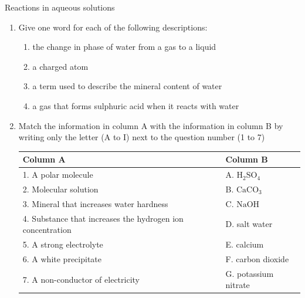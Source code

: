 {{            \begin{eocexercises}{Reactions in aqueous solutions}
            \nopagebreak
            \label{m38719*id342869}\begin{enumerate}[noitemsep, label=\textbf{\arabic*}. ] 
            \label{m38719*uid107}\item Give one word for each of the following descriptions:
\label{m38719*id342885}\begin{enumerate}[noitemsep, label=\textbf{\alph*}. ] 
            \label{m38719*uid108}\item the change in phase of water from a gas to a liquid
\label{m38719*uid109}\item a charged atom
\label{m38719*uid110}\item a term used to describe the mineral content of water
\label{m38719*uid111}\item a gas that forms sulphuric acid when it reacts with water
\end{enumerate}
\label{m38719*uid112}\item Match the information in column A with the information in column B by writing only the letter (A to I) next to the question number (1 to 7)
          \begin{table}[H]
        \begin{center}
      \label{m38719*id342952}
    \noindent
      \begin{tabular}{|l|l|}\hline
        \textbf{Column A} &
        \textbf{Column B} \\ \hline
        1. A polar molecule &
        A. ${\text{H}}_{2}{\text{SO}}_{4}$ \\ \hline
        2. Molecular solution &
        B. ${\text{CaCO}}_{3}$ \\ \hline
        3. Mineral that increases water hardness &
        C. $\text{NaOH}$ \\ \hline
        4. Substance that increases the hydrogen ion concentration &
        D. salt water \\ \hline
        5. A strong electrolyte &
        E. calcium \\ \hline
        6. A white precipitate &
        F. carbon dioxide \\ \hline
        7. A non-conductor of electricity &
        G. potassium nitrate \\ \hline

\end{tabular}
\end{center}
\end{table}
\end{enumerate}
\end{eocexercises}}}

